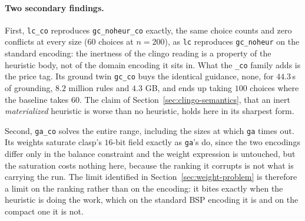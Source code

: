 \paragraph{Two secondary findings.} First, \texttt{lc\_co} reproduces \texttt{gc\_noheur\_co} exactly, the same choice counts and zero conflicts at every size ($60$ choices at $n=200$), as \texttt{lc} reproduces \texttt{gc\_noheur} on the standard encoding: the inertness of the clingo reading is a property of the heuristic body, not of the domain encoding it sits in. What the \texttt{\_co} family adds is the price tag. Its ground twin \texttt{gc\_co} buys the identical guidance, none, for $44.3$\,s of grounding, $8.2$ million rules and $4.3$ GB, and ends up taking $100$ choices where the baseline takes $60$. The claim of Section~\ref{sec:clingo-semantics}, that an inert \emph{materialized} heuristic is worse than no heuristic, holds here in its sharpest form.

Second, \texttt{ga\_co} solves the entire range, including the sizes at which \texttt{ga} times out. Its weights saturate clasp's $16$-bit field exactly as \texttt{ga}'s do, since the two encodings differ only in the balance constraint and the weight expression is untouched, but the saturation costs nothing here, because the ranking it corrupts is not what is carrying the run. The limit identified in Section~\ref{sec:weight-problem} is therefore a limit on the ranking rather than on the encoding: it bites exactly when the heuristic is doing the work, which on the standard BSP encoding it is and on the compact one it is not.
